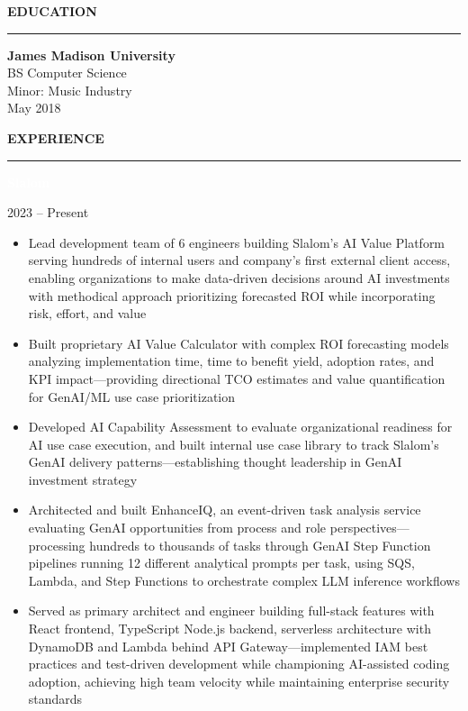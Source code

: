 \documentclass[10pt,letterpaper]{article}
\newcommand{\sectiontitle}[1]{%
    \vspace{10pt}
    {\displayfont\normalsize\textcolor{headerBg}{\MakeUppercase{\textbf{#1}}}}
    \vspace{2pt}
    \par\noindent\textcolor{accentCyan}{\rule{1.2in}{2.5pt}}
    \vspace{6pt}
}
\newcommand{\companyBlock}[3]{%
    \vspace{4pt}
    \noindent\colorbox{#3}{\textcolor{white}{\scriptsize\textbf{\hspace{3pt}#1\hspace{3pt}}}}
    \vspace{2pt}
}
\begin{document}
{\begin{minipage}[t][8.6in][t]{\paperwidth}
\begin{minipage}[t]{3.2in}
\sectiontitle{Education}
{\small
\textbf{\textcolor{darktext}{James Madison University}}\\[3pt]
\textcolor{mediumtext}{BS Computer Science}\\[2pt]
\textcolor{mediumtext}{Minor: Music Industry}\\[2pt]
\textcolor{accentCyan}{May 2018}
}

\end{minipage}%
\hspace{0.3in}%
\begin{minipage}[t]{4in}
\raggedright

\sectiontitle{Experience}

\companyBlock{Slalom}{2023 – Present}{company1}

\noindent{\small\textbf{\textcolor{darktext}{Technical Lead - AI Value Platform}}} \hfill {\scriptsize\textcolor{mediumtext}{2023 – Present}}
\begin{itemize}
\renewcommand{\labelitemi}{\textcolor{company1}{\rule{4pt}{4pt}}}
    \item{\scriptsize\textcolor{darktext}{Lead development team of 6 engineers building Slalom's AI Value Platform serving hundreds of internal users and company's first external client access, enabling organizations to make data-driven decisions around AI investments with methodical approach prioritizing forecasted ROI while incorporating risk, effort, and value}}
    \item{\scriptsize\textcolor{darktext}{Built proprietary AI Value Calculator with complex ROI forecasting models analyzing implementation time, time to benefit yield, adoption rates, and KPI impact—providing directional TCO estimates and value quantification for GenAI/ML use case prioritization}}
    \item{\scriptsize\textcolor{darktext}{Developed AI Capability Assessment to evaluate organizational readiness for AI use case execution, and built internal use case library to track Slalom's GenAI delivery patterns—establishing thought leadership in GenAI investment strategy}}
    \item{\scriptsize\textcolor{darktext}{Architected and built EnhanceIQ, an event-driven task analysis service evaluating GenAI opportunities from process and role perspectives—processing hundreds to thousands of tasks through GenAI Step Function pipelines running 12 different analytical prompts per task, using SQS, Lambda, and Step Functions to orchestrate complex LLM inference workflows}}
    \item{\scriptsize\textcolor{darktext}{Served as primary architect and engineer building full-stack features with React frontend, TypeScript Node.js backend, serverless architecture with DynamoDB and Lambda behind API Gateway—implemented IAM best practices and test-driven development while championing AI-assisted coding adoption, achieving high team velocity while maintaining enterprise security standards}}
\end{itemize}
\vspace{4pt}


\end{minipage}
\end{minipage}}
\end{document}
